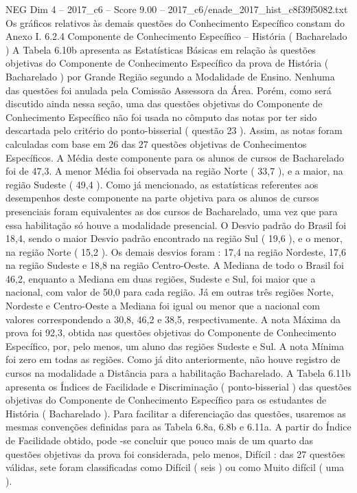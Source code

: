 \begin{textsample}{NEG Dim 4 – 2017\_c6 – Score 9.00 – 2017\_c6/enade\_2017\_hist\_c8f39f5082.txt}
Os gráficos relativos às demais questões do Conhecimento Específico constam do Anexo I. 6.2.4 Componente de Conhecimento Específico – História ( Bacharelado ) A Tabela 6.10b apresenta as Estatísticas Básicas em relação às questões objetivas do Componente de Conhecimento Específico da prova de História ( Bacharelado ) por Grande Região segundo a Modalidade de Ensino.
Nenhuma das questões foi anulada pela Comissão Assessora da Área.
Porém, como será discutido ainda nessa seção, uma das questões objetivas do Componente de Conhecimento Específico não foi usada no cômputo das notas por ter sido descartada pelo critério do ponto-bisserial ( questão 23 ).
Assim, as notas foram calculadas com base em 26 das 27 questões objetivas de Conhecimentos Específicos.
A Média deste componente para os alunos de cursos de Bacharelado foi de 47,3.
A menor Média foi observada na região Norte ( 33,7 ), e a maior, na região Sudeste ( 49,4 ).
Como já mencionado, as estatísticas referentes aos desempenhos deste componente na parte objetiva para os alunos de cursos presenciais foram equivalentes as dos cursos de Bacharelado, uma vez que para essa habilitação só houve a modalidade presencial.
O Desvio padrão do Brasil foi 18,4, sendo o maior Desvio padrão encontrado na região Sul ( 19,6 ), e o menor, na região Norte ( 15,2 ).
Os demais desvios foram : 17,4 na região Nordeste, 17,6 na região Sudeste e 18,8 na região Centro-Oeste.
A Mediana de todo o Brasil foi 46,2, enquanto a Mediana em duas regiões, Sudeste e Sul, foi maior que a nacional, com valor de 50,0 para cada região.
Já em outras três regiões Norte, Nordeste e Centro-Oeste a Mediana foi igual ou menor que a nacional com valores correspondendo a 30,8, 46,2 e 38,5, respectivamente.
A nota Máxima da prova foi 92,3, obtida nas questões objetivas do Componente de Conhecimento Específico, por, pelo menos, um aluno das regiões Sudeste e Sul.
A nota Mínima foi zero em todas as regiões.
Como já dito anteriormente, não houve registro de cursos na modalidade a Distância para a habilitação Bacharelado.
A Tabela 6.11b apresenta os Índices de Facilidade e Discriminação ( ponto-bisserial ) das questões objetivas do Componente de Conhecimento Específico para os estudantes de História ( Bacharelado ).
Para facilitar a diferenciação das questões, usaremos as mesmas convenções definidas para as Tabela 6.8a, 6.8b e 6.11a.
A partir do Índice de Facilidade obtido, pode -se concluir que pouco mais de um quarto das questões objetivas da prova foi considerada, pelo menos, Difícil : das 27 questões válidas, sete foram classificadas como Difícil ( seis ) ou como Muito difícil ( uma ).

\end{textsample}
